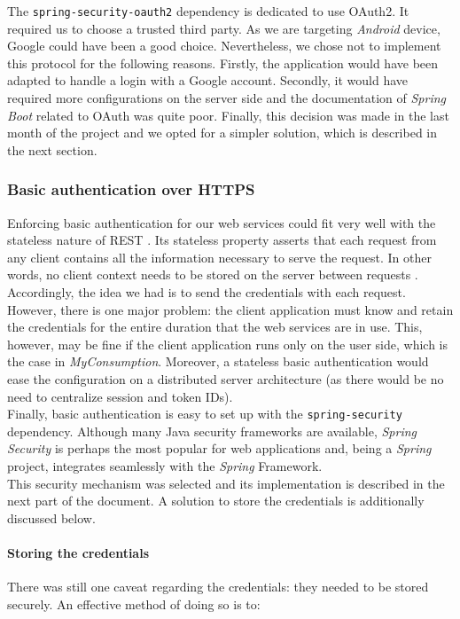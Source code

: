 \documentclass[a4paper, oneside, 11pt]{book}
\begin{document}
The \texttt{spring-security-oauth2} dependency is dedicated to use OAuth2. It required us to choose a trusted third party. As we are targeting \textit{Android} device, Google could have been a good choice. Nevertheless, we chose not to implement this protocol for the following reasons. Firstly, the application would have been adapted to handle a login with a Google account. Secondly, it would have required more configurations on the server side and the documentation of \textit{Spring Boot} related to OAuth was quite poor. Finally, this decision was made in the last month of the project and we opted for a simpler solution, which is described in the next section.

\subsubsection{Basic authentication over HTTPS}
Enforcing basic authentication for our web services could fit very well with the stateless  nature of REST \cite{professional:book}. Its stateless property asserts that each request from any client contains all the information necessary to serve the request. In other words, no client context needs to be stored on the server between requests \cite{REST:online}. Accordingly, the idea we had is to send the credentials with each request. However, there is one major problem: the client application must know and retain the credentials for the entire duration that the web services are in use. This, however, may be fine if the client application runs only on the user side, which is the case in \textit{MyConsumption}. Moreover, a stateless basic authentication would ease the configuration on a distributed server architecture (as there would be no need to centralize session and token IDs).\\

Finally, basic authentication is easy to set up with the \texttt{spring-security} dependency. Although many Java security frameworks are available, \textit{Spring Security} is perhaps the most popular for web applications and, being a \textit{Spring} project, integrates seamlessly with the \textit{Spring} Framework. \\

This security mechanism was selected and its implementation is described in the next part of the document. A solution to store the credentials is additionally discussed below.

\paragraph{Storing the credentials}
There was still one caveat regarding the credentials: they needed to be stored securely. An effective method of doing so is to:
\end{document}
